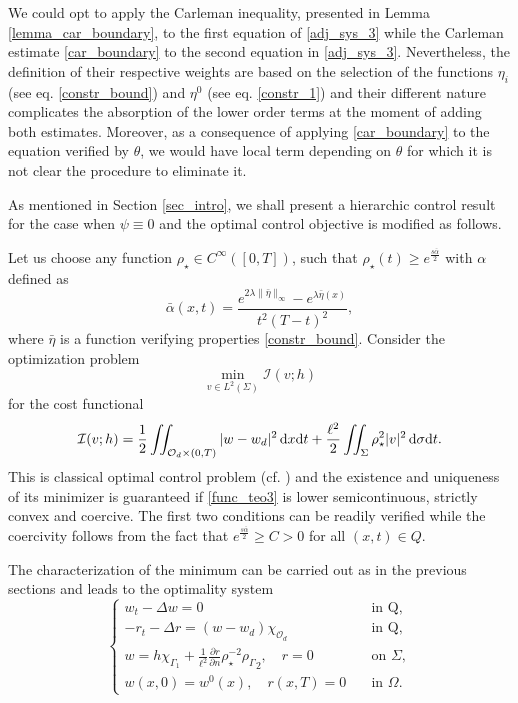 \documentclass{aims}
\theoremstyle{definition}
\newcommand\csin[1]{\chi_{#1}}
\def\csbd{\rho_{\Gamma}}
\def\dx{\,\textnormal{d}x}
\def\dt{\textnormal{d}t}
\def\d{\,\textnormal{d}}
\begin{document}
We could opt to apply the Carleman inequality, presented in Lemma \ref{lemma_car_boundary}, to the first equation of \eqref{adj_sys_3} while the Carleman estimate \eqref{car_boundary} to the second equation in \eqref{adj_sys_3}. Nevertheless, the definition of their respective weights are based on the selection of the functions $\eta_i$ (see eq. \eqref{constr_bound}) and $\eta^0$ (see eq. \eqref{constr_1}) and their different nature complicates the absorption of the lower order terms at the moment of adding both estimates. Moreover, as a consequence of applying \eqref{car_boundary} to the equation verified by $\theta$, we would have local term depending on $\theta$ for which it is not clear the procedure to eliminate it. 

As mentioned in Section \ref{sec_intro}, we shall present a hierarchic control result for the case when $\psi\equiv 0$ and the optimal control objective is modified as follows. 

Let us choose any function $\rho_\star\in C^\infty([0,T])$, such that $\rho_\star(t)\geq e^{\frac{s\bar\alpha}{2}}$ with $\alpha$ defined as
%
\begin{equation*}
\bar\alpha(x,t)=\frac{e^{2\lambda\|\bar\eta\|_{\infty}}-e^{\lambda\bar\eta(x)}}{t^2(T-t)^2},
\end{equation*}
%
where $\bar\eta$ is a function verifying properties \eqref{constr_bound}. 
%
%
Consider the optimization problem
%
\begin{equation*}
\min_{v\in L^2(\Sigma)} \mathcal I(v;h)
\end{equation*}
%
for the cost functional
%
\begin{equation*}%
\mathcal I(v;h)=\frac{1}{2}\iint_{\mathcal O_d\times(0,T)}|w-w_d|^2\dx\dt+\frac{\ell^2}{2}\iint_{\Sigma}\rho_\star^2|v|^2\d\sigma\dt.
\end{equation*}
%
This is classical optimal control problem (cf. \cite{Lions_optim}) and the existence and uniqueness of its minimizer is  guaranteed if \eqref{func_teo3} is lower semicontinuous, strictly convex and coercive. The first two conditions can be readily verified while the coercivity follows from the fact that $e^{\frac{s\bar\alpha}{2}}\geq C>0$ for all $(x,t)\in Q$. 

The characterization of the minimum can be carried out as in the previous sections and leads to the optimality system
%
\begin{equation*}%
\begin{cases}
w_t-\Delta w=0 &\quad  \text{in Q}, \\
-r_t-\Delta r= (w-w_d)\chi_{\mathcal O_d}  &\quad  \text{in Q},\\ 
w=h\csin{\Gamma_1}+ \frac{1}{\ell^2}\frac{\partial r}{\partial n}\rho_\star^{-2}{\csbd}_2, \quad r=0 &\quad \text{on } \Sigma, \\
w(x,0)=w^0(x),\quad r(x,T)=0 &\quad \text{in } \Omega.
\end{cases}
\end{equation*}
\end{document}
